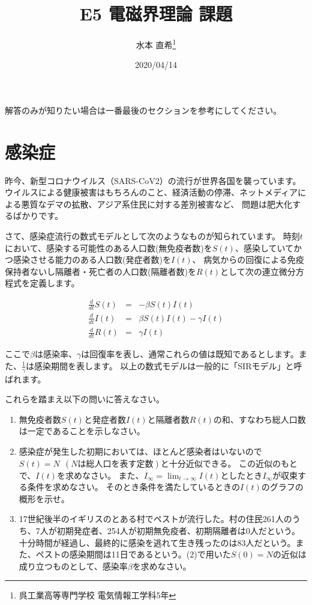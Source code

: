 \documentclass{jsarticle}
\title{E5 電磁界理論 課題}
\author{水本 直希\thanks{呉工業高等専門学校 電気情報工学科5年}}
\date{2020/04/14}
\newcommand{\dfrac}[2]{\displaystyle\frac{{#1}}{{#2}}}
\begin{document}
\maketitle

解答のみが知りたい場合は一番最後のセクションを参考にしてください。

\section{感染症}

昨今、新型コロナウイルス（SARS-CoV2）の流行が世界各国を襲っています。
ウイルスによる健康被害はもちろんのこと、経済活動の停滞、ネットメディアによる悪質なデマの拡散、アジア系住民に対する差別被害など、
問題は肥大化するばかりです。

さて、感染症流行の数式モデルとして次のようなものが知られています。
時刻$t$において、感染する可能性のある人口数(無免疫者数)を$S(t)$、感染していてかつ感染させる能力のある人口数(発症者数)を$I(t)$、
病気からの回復による免疫保持者ないし隔離者・死亡者の人口数(隔離者数)を$R(t)$として次の連立微分方程式を定義します。

  \begin{eqnarray*}
    \dfrac{d}{dt}S(t) &=& -\beta S(t)I(t) \\
    \dfrac{d}{dt}I(t) &=& \beta S(t)I(t) - \gamma I(t) \\
    \dfrac{d}{dt}R(t) &=& \gamma I(t)
  \end{eqnarray*}

ここで$\beta$は感染率、$\gamma$は回復率を表し、通常これらの値は既知であるとします。また、$\dfrac{1}{\gamma}$は感染期間を表します。
以上の数式モデルは一般的に「SIRモデル」と呼ばれます。

これらを踏まえ以下の問いに答えなさい。

\begin{enumerate}[(1)]
  \item 無免疫者数$S(t)$と発症者数$I(t)$と隔離者数$R(t)$の和、すなわち総人口数は一定であることを示しなさい。
  \item 感染症が発生した初期においては、ほとんど感染者はいないので$S(t) = N\ \ (Nは総人口を表す定数)$と十分近似できる。
  この近似のもとで、$I(t)$を求めなさい。
  また、$I_{\infty} = \displaystyle\lim_{t \to \infty} I(t)$としたとき$I_{\infty}$が収束する条件を求めなさい。
  そのとき条件を満たしているときの$I(t)$のグラフの概形を示せ。
  \item 17世紀後半のイギリスのとある村でペストが流行した。村の住民261人のうち、7人が初期発症者、254人が初期無免疫者、初期隔離者は0人だという。十分時間が経過し、最終的に感染を逃れて生き残ったのは83人だという。また、ペストの感染期間は11日であるという。(2)で用いた$S(0) = N$の近似は成り立つものとして、感染率$\beta$を求めなさい。
\end{enumerate}
\end{document}
